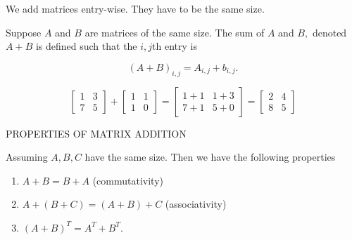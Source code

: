 We add matrices entry-wise. They have to be the same size.

\begin{definition}
    Suppose \(A\) and \(B\) are matrices of the same size. The sum of \(A\) and \(B,\) denoted \(A+B\) is defined such that the \(i,j\)th entry is

    \[\left( A+B \right)_{i,j} = A_{i,j} + b_{i,j}.\]
\end{definition}

\begin{example}
    \[\begin{bmatrix}
        1 & 3 \\
        7 & 5
    \end{bmatrix} + \begin{bmatrix}
        1 & 1\\
        1 & 0
    \end{bmatrix} = \begin{bmatrix}
        1+1 & 1+3 \\
        7+1 & 5+0
    \end{bmatrix} = \begin{bmatrix}
        2 & 4 \\
        8 & 5
    \end{bmatrix}\]
\end{example}

PROPERTIES OF MATRIX ADDITION

Assuming \(A,B,C\) have the same size. Then we have the following properties
\begin{enumerate}
    \item \(A+B = B+A \)  (commutativity)
    \item \(A + \left( B+C \right) = \left(A+B\right)+C\) (associativity)
    \item \(\left(A+B\right)^T = A^T+B^T.\)
\end{enumerate}